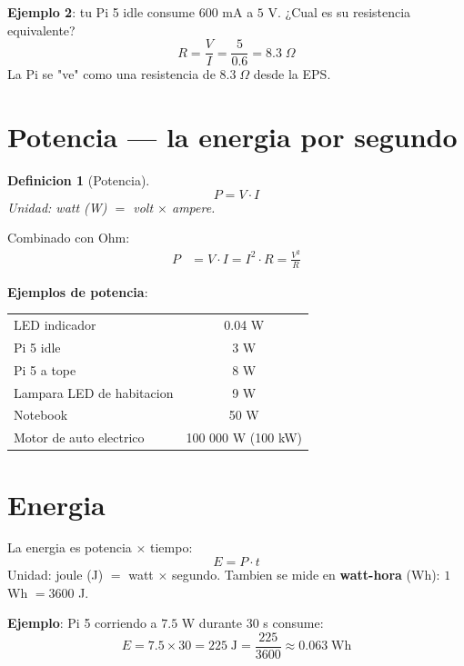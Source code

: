 \documentclass[11pt,a4paper,oneside,openright]{book}
\newtheorem{definicion}{Definicion}[chapter]
\begin{document}
\begin{calculo}
\textbf{Ejemplo 2}: tu Pi 5 idle consume $600$ mA a $5$ V. ¿Cual es su
resistencia equivalente?
\[
R = \frac{V}{I} = \frac{5}{0.6} = 8.3\;\Omega
\]
La Pi se "ve" como una resistencia de $8.3\;\Omega$ desde la EPS.
\end{calculo}

\section{Potencia --- la energia por segundo}

\begin{definicion}[Potencia]
\begin{equation}
\boxed{P = V \cdot I}
\label{eq:power}
\end{equation}
Unidad: watt (W) $=$ volt $\times$ ampere.
\end{definicion}

Combinado con Ohm:
\begin{align}
P &= V \cdot I = I^2 \cdot R = \frac{V^2}{R}
\end{align}

\textbf{Ejemplos de potencia}:
\begin{center}
\begin{tabular}{lc}
\toprule
LED indicador & 0.04 W \\
Pi 5 idle & 3 W \\
Pi 5 a tope & 8 W \\
Lampara LED de habitacion & 9 W \\
Notebook & 50 W \\
Motor de auto electrico & 100 000 W (100 kW) \\
\bottomrule
\end{tabular}
\end{center}

\section{Energia}

La energia es potencia $\times$ tiempo:
\begin{equation}
E = P \cdot t
\end{equation}
Unidad: joule (J) $=$ watt $\times$ segundo. Tambien se mide en
\textbf{watt-hora} (Wh): $1$ Wh $= 3600$ J.

\textbf{Ejemplo}: Pi 5 corriendo a $7.5$ W durante $30$ s consume:
\[
E = 7.5 \times 30 = 225\;\text{J} = \frac{225}{3600} \approx 0.063\;\text{Wh}
\]
\end{document}
